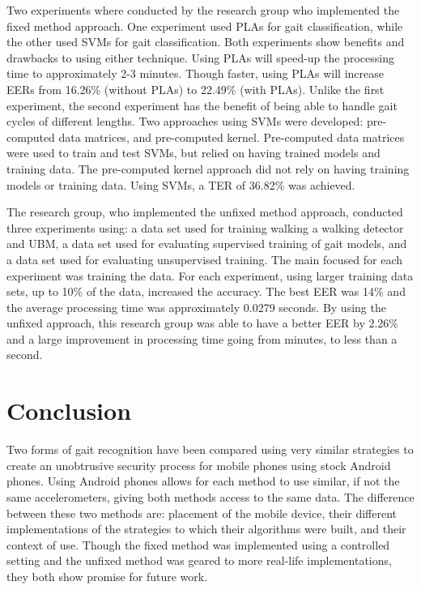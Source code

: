 \documentclass{sig-alternate}
\begin{document}
	Two experiments where conducted by the research group who implemented the fixed method approach. One experiment used PLAs for gait classification, while the other used SVMs for gait classification. Both experiments show benefits and drawbacks to using either technique. Using PLAs will speed-up the processing time to approximately 2-3 minutes. Though faster, using PLAs will increase EERs from 16.26\% (without PLAs) to 22.49\% (with PLAs). Unlike the first experiment, the second experiment has the benefit of being able to handle gait cycles of different lengths. Two approaches using SVMs were developed: pre-computed data matrices, and pre-computed kernel. Pre-computed data matrices were used to train and test SVMs, but relied on having trained models and training data. The pre-computed kernel approach did not rely on having training models or training data. Using SVMs, a TER of 36.82\% was achieved. 
	
		
		The research group, who implemented the unfixed method approach, conducted three experiments using: a data set used for training walking a walking detector and UBM, a data set used for evaluating supervised training of gait models, and a data set used for evaluating unsupervised training. The main focused for each experiment was training the data. For each experiment, using larger training data sets, up to 10\% of the data, increased the accuracy. The best EER was 14\% and the average processing time was approximately 0.0279 seconds. By using the unfixed approach, this research group was able to have a better EER by 2.26\% and a large improvement in processing time going from minutes, to less than a second.
\\
\section{Conclusion}
	Two forms of gait recognition have been compared using very similar strategies to create an unobtrusive security process for mobile phones using stock Android phones. Using Android phones allows for each method to use similar, if not the same accelerometers, giving both methods access to the same data. The difference between these two methods are: placement of the mobile device, their different implementations of the strategies to which their algorithms were built, and their context of use. Though the fixed method was implemented using a controlled setting and the unfixed method was geared to more real-life implementations, they both show promise for future work. 
\end{document}
